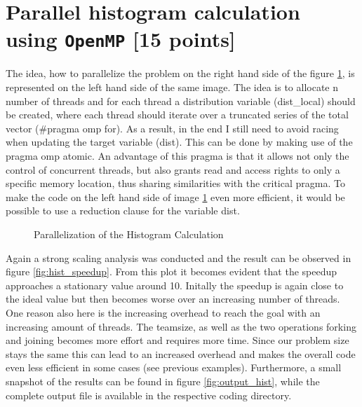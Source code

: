 \documentclass[unicode,11pt,a4paper,oneside,numbers=endperiod,openany]{scrartcl}
\begin{document}
\section{Parallel histogram calculation using \texttt{OpenMP} [15 points]}
\indent
The idea, how to parallelize the problem on the right hand side of the figure \ref{fig:hist_code}, is represented 
on the left hand side of the same image. The idea is to allocate n number of threads and for each thread a distribution 
variable (dist\_local) should be created, where each thread should iterate over a truncated series of the total vector ($\#$pragma omp for). 
As a result, in the end I still need to avoid racing when updating the target variable (dist). This can be done by making use 
of the pragma omp atomic. An advantage of this pragma is that it allows not only the control of concurrent threads, but also 
grants read and access rights to only a specific memory location, thus sharing similarities with the critical pragma. To make the code on 
the left hand side of image \ref{fig:hist_code} even more efficient, it would be possible to use a reduction clause for the variable dist.
\begin{figure}[H]
  \centering
  {\fontsize{8}{10}\selectfont
  }
  \caption{Parallelization of the Histogram Calculation}
  \label{fig:hist_code}
\end{figure}
\indent
Again a strong scaling analysis was conducted and the result can be observed in figure \ref{fig:hist_speedup}. From this plot it 
becomes evident that the speedup approaches a stationary value around 10. Initally the speedup is again close to the ideal value but then 
becomes worse over an increasing number of threads. One reason also here is the increasing overhead to reach the goal with an increasing 
amount of threads. The teamsize, as well as the two operations forking and joining becomes more effort and requires more time. Since our 
problem size stays the same this can lead to an increased overhead and makes the overall code even less efficient in some cases (see previous 
examples). Furthermore, a small snapshot of the results can be found in figure \ref{fig:output_hist}, while the complete output file is 
available in the respective coding directory.
\end{document}
